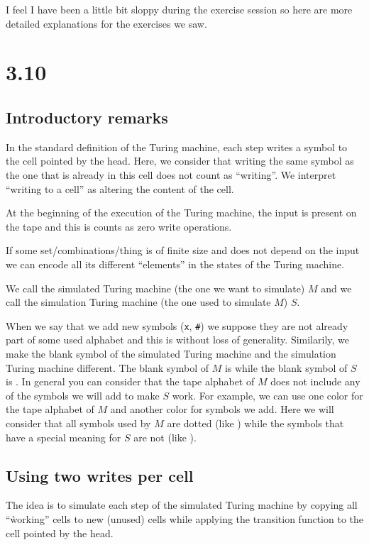 \documentclass{article}
\newcommand\obullet[1]{\ThisStyle{\ensurestackMath{%
  \stackon[1pt]{\SavedStyle#1}{\SavedStyle\kern.6\LMpt\bullet}}}}
\newcommand{\blank}{\textvisiblespace}
\begin{document}
I feel I have been a little bit sloppy during the exercise session so here are
more detailed explanations for the exercises we saw.

\section*{3.10}

\subsection*{Introductory remarks}
In the standard definition of the Turing machine, each step writes a symbol to
the cell pointed by the head. Here, we consider that writing the same symbol as
the one that is already in this cell does not count as ``writing''. We
interpret ``writing to a cell'' as altering the content of the cell.

At the beginning of the execution of the Turing machine, the input is
present on the tape and this is counts as zero write operations.

If some set/combinations/thing is of finite size and does not depend on the input
we can encode all its different ``elements'' in the states of the Turing machine.

We call the simulated Turing machine (the one we want to simulate) \(M\) and we
call the simulation Turing machine (the one used to simulate \(M\)) \(S\).

When we say that we add new symbols (\texttt{x}, \texttt{\#}) we suppose they
are not already part of some used alphabet and this is without loss of
generality.
Similarily, we make the blank symbol of the simulated Turing machine and the
simulation Turing machine different. The blank symbol of \(M\)
is \texttt{\obullet{\blank}} while the blank symbol of \(S\)
is \texttt{\blank}. In general you can consider that the tape alphabet of \(M\)
does not include any of the symbols we will add to make \(S\) work.
For example, we can use one color for the tape alphabet of \(M\) and
another color for symbols we add. Here we will consider that all symbols used
by \(M\) are dotted (like \texttt{\obullet{\blank}}) while the symbols that
have a special meaning for \(S\) are not (like \texttt{\blank}).

\subsection*{Using two writes per cell}
The idea is to simulate each step of the simulated
Turing machine by copying all ``ẁorking'' cells to new (unused) cells
while applying the transition function to the cell pointed by the head.
\end{document}
